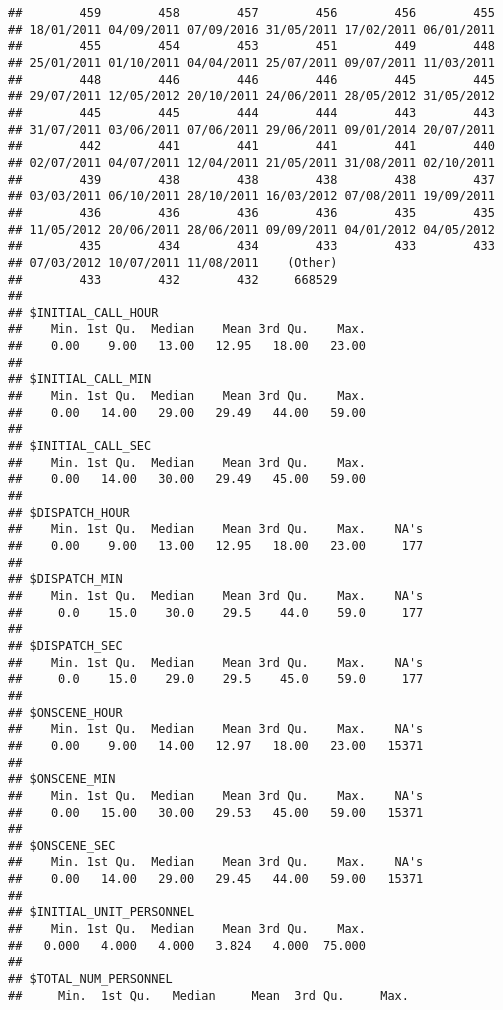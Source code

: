 \documentclass[]{article}
\begin{document}
\begin{verbatim}
##        459        458        457        456        456        455 
## 18/01/2011 04/09/2011 07/09/2016 31/05/2011 17/02/2011 06/01/2011 
##        455        454        453        451        449        448 
## 25/01/2011 01/10/2011 04/04/2011 25/07/2011 09/07/2011 11/03/2011 
##        448        446        446        446        445        445 
## 29/07/2011 12/05/2012 20/10/2011 24/06/2011 28/05/2012 31/05/2012 
##        445        445        444        444        443        443 
## 31/07/2011 03/06/2011 07/06/2011 29/06/2011 09/01/2014 20/07/2011 
##        442        441        441        441        441        440 
## 02/07/2011 04/07/2011 12/04/2011 21/05/2011 31/08/2011 02/10/2011 
##        439        438        438        438        438        437 
## 03/03/2011 06/10/2011 28/10/2011 16/03/2012 07/08/2011 19/09/2011 
##        436        436        436        436        435        435 
## 11/05/2012 20/06/2011 28/06/2011 09/09/2011 04/01/2012 04/05/2012 
##        435        434        434        433        433        433 
## 07/03/2012 10/07/2011 11/08/2011    (Other) 
##        433        432        432     668529 
## 
## $INITIAL_CALL_HOUR
##    Min. 1st Qu.  Median    Mean 3rd Qu.    Max. 
##    0.00    9.00   13.00   12.95   18.00   23.00 
## 
## $INITIAL_CALL_MIN
##    Min. 1st Qu.  Median    Mean 3rd Qu.    Max. 
##    0.00   14.00   29.00   29.49   44.00   59.00 
## 
## $INITIAL_CALL_SEC
##    Min. 1st Qu.  Median    Mean 3rd Qu.    Max. 
##    0.00   14.00   30.00   29.49   45.00   59.00 
## 
## $DISPATCH_HOUR
##    Min. 1st Qu.  Median    Mean 3rd Qu.    Max.    NA's 
##    0.00    9.00   13.00   12.95   18.00   23.00     177 
## 
## $DISPATCH_MIN
##    Min. 1st Qu.  Median    Mean 3rd Qu.    Max.    NA's 
##     0.0    15.0    30.0    29.5    44.0    59.0     177 
## 
## $DISPATCH_SEC
##    Min. 1st Qu.  Median    Mean 3rd Qu.    Max.    NA's 
##     0.0    15.0    29.0    29.5    45.0    59.0     177 
## 
## $ONSCENE_HOUR
##    Min. 1st Qu.  Median    Mean 3rd Qu.    Max.    NA's 
##    0.00    9.00   14.00   12.97   18.00   23.00   15371 
## 
## $ONSCENE_MIN
##    Min. 1st Qu.  Median    Mean 3rd Qu.    Max.    NA's 
##    0.00   15.00   30.00   29.53   45.00   59.00   15371 
## 
## $ONSCENE_SEC
##    Min. 1st Qu.  Median    Mean 3rd Qu.    Max.    NA's 
##    0.00   14.00   29.00   29.45   44.00   59.00   15371 
## 
## $INITIAL_UNIT_PERSONNEL
##    Min. 1st Qu.  Median    Mean 3rd Qu.    Max. 
##   0.000   4.000   4.000   3.824   4.000  75.000 
## 
## $TOTAL_NUM_PERSONNEL
##     Min.  1st Qu.   Median     Mean  3rd Qu.     Max. 

\end{verbatim}
\end{document}
